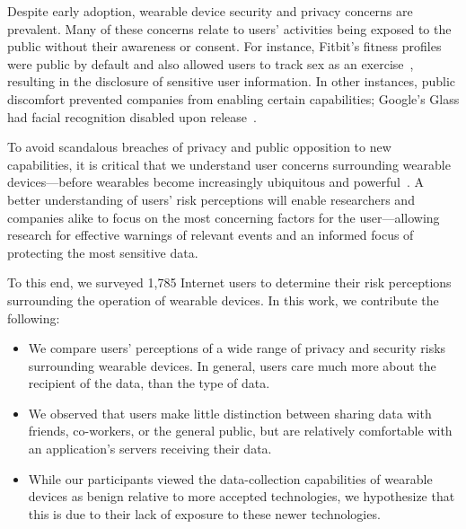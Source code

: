 \documentclass{acm_proc_article-sp}
\begin{document}
Despite early adoption, wearable device security and privacy concerns are prevalent. Many of these concerns relate to users' activities being exposed to the public without their awareness or consent. For instance, Fitbit's fitness profiles were public by default and also allowed users to track sex as an exercise~\cite{Fitbit}, resulting in the disclosure of sensitive user information. In other instances, public discomfort prevented companies from enabling certain capabilities; Google's Glass had facial recognition disabled upon release~\cite{GlassDetection}.

To avoid scandalous breaches of privacy and public opposition to new capabilities, it is critical that we understand user concerns surrounding wearable devices---before wearables become increasingly ubiquitous and powerful~\cite{Implants}. A better understanding of users' risk perceptions will enable researchers and companies alike to focus on the most concerning factors for the user---allowing research for effective warnings of relevant events and an informed focus of protecting the most sensitive data.

To this end, we surveyed 1,785 Internet users to determine their risk perceptions surrounding the operation of wearable devices. In this work, we contribute the following: \\[-0.8cm]

\begin{itemize} \itemsep1pt \parskip0pt 
\item We compare users' perceptions of a wide range of privacy and security risks surrounding wearable devices. In general, users care much more about the recipient of the data, than the type of data.
\item We observed that users make little distinction between sharing data with friends, co-workers, or the general public, but are relatively comfortable with an application's servers receiving their data.
\item While our participants viewed the data-collection capabilities of wearable devices as benign relative to more accepted technologies, we hypothesize that this is due to their lack of exposure to these newer technologies.
\end{itemize}
\end{document}
